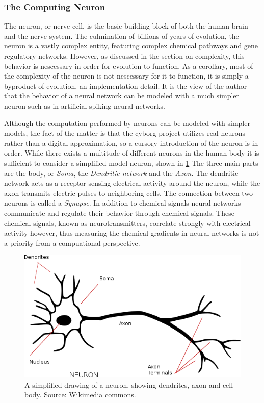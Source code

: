 \subsubsection{The Computing Neuron}
The neuron, or nerve cell, is the basic building block of both the human brain
and the nerve system.
The culmination of billions of years of evolution, the neuron is a vastly
complex entity, featuring complex chemical pathways and gene regulatory
networks.
However, as discussed in the section on complexity, this behavior is nescessary
in order for evolution to function.
As a corollary, most of the complexity of the neuron is not nescessary for it to
function, it is simply a byproduct of evolution, an implementation detail.
It is the view of the author that the behavior of a neural network can be
modeled with a much simpler neuron such as in artificial spiking neural
networks.\par
Although the computation performed by neurons can be modeled with simpler
models, the fact of the matter is that the cyborg project utilizes real neurons
rather than a digital approximation, so a cursory introduction of the neuron is
in order.
While there exists a multitude of different neurons in the human body it is
sufficient to consider a simplified model neuron, shown in \ref{figNeuron}
The three main parts are the body, or \emph{Soma}, the \emph{Dendritic
  network} and the \emph{Axon}. 
The dendritic network acts as a receptor sensing electrical activity around the
neuron, while the axon transmits electric pulses to neighboring cells.
The connection between two neurons is called a \emph{Synapse}.
%
In addition to chemical signals neural networks communicate and regulate their
behavior through chemical signals.
These chemical signals, known as neurotransmitters, correlate strongly with
electrical activity however, thus measuring the chemical gradients in neural
networks is not a priority from a compuational perspective.
\begin{figure}[h]
  \centering
  \includegraphics[width=1\textwidth]{fig/neuron.png}
  \caption{
    A simplified drawing of a neuron, showing dendrites, axon and cell body.
    Source: Wikimedia commons.
  }
  \label{figNeuron}
\end{figure}
